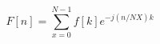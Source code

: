 \documentclass[../main.tex]{subfiles}%
\begin{document}
%
    \Xequation%
    \begin{equation}%
        F[n] = \sum_{x=0}^{N-1} f[k] e^{-j (n/NX) k}%
        \label{eq:fourier-spatial}%
    \end{equation}%
\end{document}
